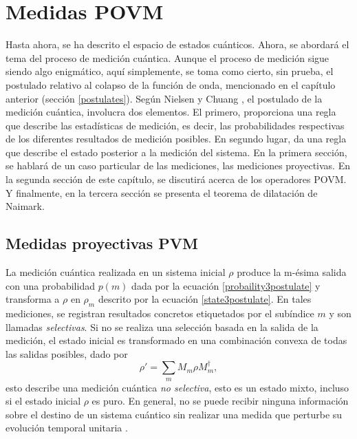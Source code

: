 \chapter{Medidas POVM}\label{MedidaPOVM}
Hasta ahora, se ha descrito el espacio de estados cuánticos. Ahora, se abordará el tema del proceso de medición cuántica. Aunque el proceso de medición  sigue siendo algo enigmático, aquí simplemente, se toma como cierto, sin prueba, el postulado relativo al colapso de la función de onda, mencionado en el capítulo anterior (sección {\ref{postulates}}). Según Nielsen y Chuang {\cite{nielsen_chuang_2010}}, el postulado de la medici\'on cuántica, involucra dos elementos. El primero, proporciona una regla que describe las estadísticas de medición, es decir, las probabilidades respectivas de los diferentes resultados de medición posibles. En segundo lugar, da una regla que describe el estado posterior a la medición del sistema.  En la primera sección, se hablará de un caso particular de las mediciones, las mediciones proyectivas. En la segunda sección de este capítulo, se discutirá acerca de los operadores POVM\@. Y finalmente, en la tercera sección se presenta el teorema de dilatación de Naimark. 











\section{Medidas proyectivas PVM}
La medición cuántica realizada en un sistema inicial $\rho$ produce  la m-ésima salida con una probabilidad $p(m)$ dada por la ecuación {\ref{probaility3postulate}} y transforma a $\rho $ en $\rho_m$ descrito por la ecuación {\ref{state3postulate}}. En tales mediciones, se registran resultados concretos etiquetados por el subíndice $m$ y son llamadas \textit{selectivas}. Si no se realiza una selección basada en la salida de la medición, el estado inicial es transformado en una combinación convexa de todas las salidas posibles, dado por 
\begin{equation}\label{non-selective-measure}
	\rho'=\sum_m M_m\rho M_m^\dagger,
\end{equation}
esto describe una medición cuántica \textit{no selectiva}, esto es un estado mixto, incluso si el estado inicial $\rho$ es puro. En general, no se puede recibir ninguna información sobre el destino de un sistema cuántico sin realizar una medida que perturbe su evolución temporal unitaria {\cite{2007geometry}}.

